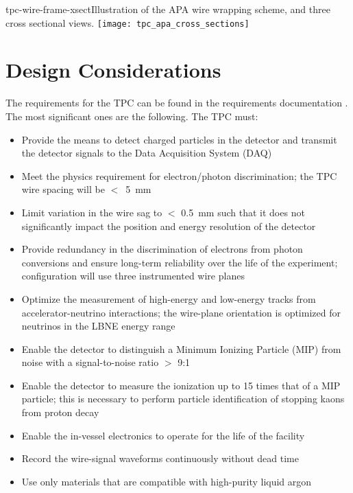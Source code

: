 \begin{cdrfigure}{tpc-wire-frame-xsect}{Illustration of the APA wire wrapping scheme, and three cross sectional views.}
\texttt{[image: tpc\_apa\_cross\_sections]}
\end{cdrfigure}


\section{Design Considerations} 
\label{sec:v5-tpc-reqs-n-specs}

The requirements for the TPC can be found in the requirements documentation \cite{lar-fd-req}. The most significant ones are the following. The TPC must:

\begin{itemize}	
\item Provide the means to detect charged particles in the detector and transmit the detector signals to the Data Acquisition System (DAQ)
\item Meet the physics requirement for electron/photon discrimination;  the TPC wire spacing will be $<$~5~mm
\item Limit variation in the wire sag to $<$ 0.5~mm such that it does not significantly impact the position and energy resolution of the detector
\item Provide redundancy in the discrimination of electrons from photon conversions and ensure long-term reliability over the life of the experiment;  configuration will use three instrumented wire planes
\item Optimize the measurement of high-energy and low-energy tracks from accelerator-neutrino interactions; the wire-plane orientation is optimized for neutrinos in the LBNE energy range
\item Enable the detector to distinguish a Minimum Ionizing Particle (MIP) from noise with a signal-to-noise ratio $>$ 9:1
\item Enable the detector to measure the ionization up to 15 times that of a MIP particle; this is necessary to perform particle identification of stopping kaons from proton decay
\item Enable the in-vessel electronics to operate for the life of the facility
\item Record the wire-signal waveforms continuously without dead time
\item Use only materials that are compatible with high-purity liquid argon

\end{itemize}

